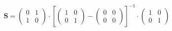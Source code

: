 \[ \mathbf{S} = \left(\begin{array}{cc} 0 & 1 \\ 1 & 0
\end{array}\right) \cdot \left[ \left(\begin{array}{cc} 1 & 0 \\ 0 & 1
\end{array}\right) - \left(\begin{array}{cc} 0 & 0 \\ 0 & 0
\end{array}\right) \right]^{-1} \cdot\left(\begin{array}{cc} 1 & 0 \\
0 & 1 \end{array}\right) \]
